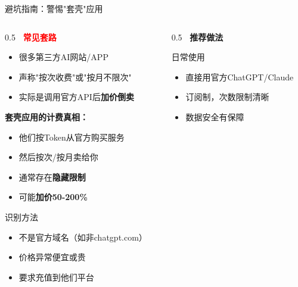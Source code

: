 \documentclass[aspectratio=169,11pt]{beamer}
\begin{document}
\begin{frame}{避坑指南：警惕"套壳"应用}
    \begin{columns}
        \begin{column}{0.5\textwidth}
            \textbf{\textcolor{red}{\faExclamationTriangle\ 常见套路}}
            \begin{itemize}
                \item 很多第三方AI网站/APP
                \item 声称"按次收费"或"按月不限次"
                \item 实际是调用官方API后\textbf{加价倒卖}
            \end{itemize}
            
            \vspace{0.3cm}
            \textbf{套壳应用的计费真相：}
            \begin{itemize}
                \item 他们按Token从官方购买服务
                \item 然后按次/按月卖给你
                \item 通常存在\textbf{隐藏限制}
                \item 可能\textbf{加价50-200\%}
            \end{itemize}
            
            \vspace{0.3cm}
            \begin{alertblock}{识别方法}
                \small
                \begin{itemize}
                    \item 不是官方域名（如非chatgpt.com）
                    \item 价格异常便宜或贵
                    \item 要求充值到他们平台
                \end{itemize}
            \end{alertblock}
        \end{column}
        \begin{column}{0.5\textwidth}
            \textbf{\textcolor{green!60!black}{\faCheckCircle\ 推荐做法}}
            
            \begin{block}{日常使用}
                \begin{itemize}
                    \item 直接用官方ChatGPT/Claude
                    \item 订阅制，次数限制清晰
                    \item 数据安全有保障
                \end{itemize}
            \end{block}
            

\end{column}
\end{columns}
\end{frame}
\end{document}
